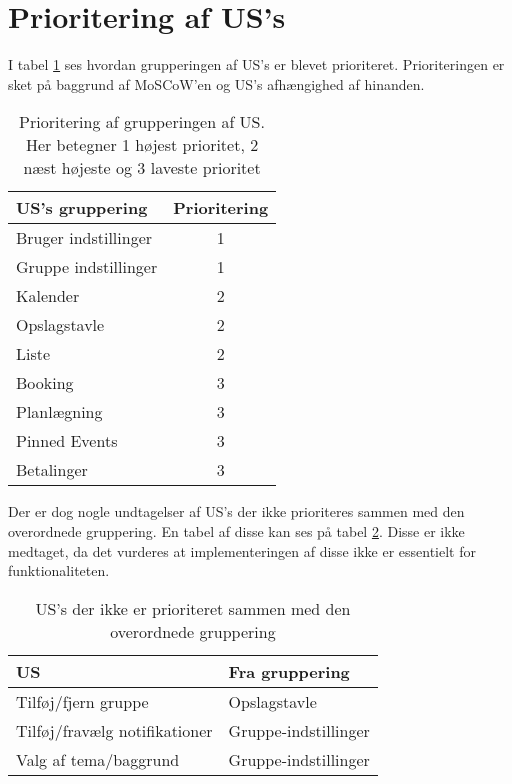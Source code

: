 \section{Prioritering af US's} 
I tabel \ref{tab:US_priotering} ses hvordan grupperingen af US's er blevet prioriteret. Prioriteringen er sket på baggrund af MoSCoW'en og US's afhængighed af hinanden. 

\begin{table}[H]
    \centering
    \begin{tabular}{|p{1.5in}|p{0.8in}|} \hline 
        \textbf{US's gruppering} & \textbf{Prioritering} \\ \hline 
        Bruger indstillinger & \multicolumn{1}{c|}{1} \\ \hline
        Gruppe indstillinger & \multicolumn{1}{c|}{1} \\ \hline 
        Kalender & \multicolumn{1}{c|}{2} \\ \hline 
        Opslagstavle & \multicolumn{1}{c|}{2} \\ \hline 
        Liste & \multicolumn{1}{c|}{2} \\ \hline 
        Booking & \multicolumn{1}{c|}{3} \\ \hline 
        Planlægning & \multicolumn{1}{c|}{3} \\ \hline 
        Pinned Events & \multicolumn{1}{c|}{3} \\ \hline 
        Betalinger & \multicolumn{1}{c|}{3} \\ \hline 
    \end{tabular}
    \caption{Prioritering af grupperingen af US. Her betegner 1 højest prioritet, 2 næst højeste og 3 laveste prioritet}
    \label{tab:US_priotering}
\end{table}

Der er dog nogle undtagelser af US's der ikke prioriteres sammen med den overordnede gruppering. En tabel af disse kan ses på tabel \ref{tab:US_ikkeImplementeret}. Disse er ikke medtaget, da det vurderes at implementeringen af disse ikke er essentielt for funktionaliteten. 

\begin{table}[H]
    \centering
    \begin{tabular}{|p{1.5in}|p{1.2in}|} \hline 
        \textbf{US} & \textbf{Fra gruppering} \\ \hline 
        Tilføj/fjern gruppe & Opslagstavle \\ \hline
        Tilføj/fravælg notifikationer & Gruppe-indstillinger \\ \hline 
        Valg af tema/baggrund & Gruppe-indstillinger \\ \hline 
    \end{tabular}
    \caption{US's der ikke er prioriteret sammen med den overordnede gruppering}
    \label{tab:US_ikkeImplementeret}
\end{table}

